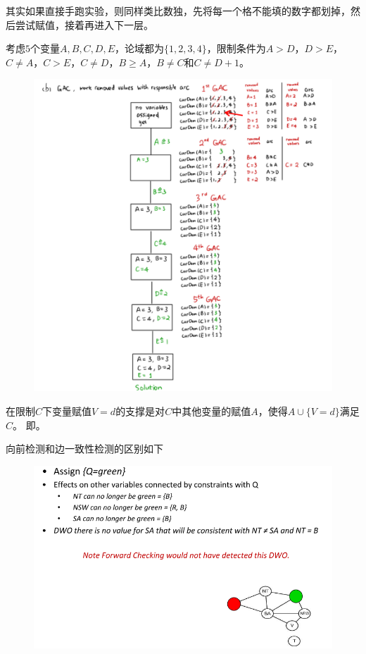 其实如果直接手跑实验，则同样类比数独，先将每一个格不能填的数字都划掉，然后尝试赋值，接着再进入下一层。
\begin{example}
考虑$5$个变量$A,B,C,D,E$，论域都为$\{1,2,3,4\}$，限制条件为$A > D$，$D > E$，$C \ne A$，$C > E$，$C \ne D$，$B \geq A$，$B \ne C$和$C \ne D + 1$。
\end{example}
\begin{analysis}
\begin{figure}[H]
\centering
\includegraphics[width=0.7\linewidth]{fig/T02-2.png}
\end{figure}
\end{analysis}

\begin{definition}[支撑]
在限制$C$下变量赋值$V=d$的支撑是对$C$中其他变量的赋值$A$，使得$A\cup\{V=d\}$满足$C$。
即。
\end{definition}

向前检测和边一致性检测的区别如下
\begin{figure}[H]
\centering
\includegraphics[width=0.8\linewidth]{fig/diff_fc_gac.png}
\end{figure}